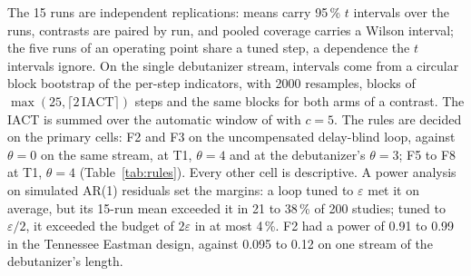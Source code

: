 The 15 runs are independent replications: means carry 95\,\% $t$ intervals over the runs,
contrasts are paired by run, and pooled coverage carries a Wilson interval; the five runs of an
operating point share a tuned step, a dependence the $t$ intervals ignore. On the single
debutanizer stream, intervals come from a circular block bootstrap \citep{politis1992} of the
per-step indicators, with 2000 resamples, blocks of $\max(25, \lceil 2\,\mathrm{IACT}\rceil)$
steps and the same blocks for both arms of a contrast. The IACT is summed over the automatic
window of \citet{sokal1997} with $c = 5$. The rules are decided on the primary cells: F2 and F3 on
the uncompensated delay-blind loop, against $\theta = 0$ on the same stream, at T1, $\theta = 4$
and at the debutanizer's $\theta = 3$; F5 to F8 at T1, $\theta = 4$ (Table~\ref{tab:rules}).
Every other cell is descriptive. A power analysis on simulated AR(1) residuals set the margins: a
loop tuned to $\varepsilon$ met it on average, but its 15-run mean exceeded it in 21 to 38\,\% of
200 studies; tuned to $\varepsilon/2$, it exceeded the budget of $2\varepsilon$ in at most
4\,\%. F2 had a power of 0.91 to 0.99 in the Tennessee Eastman design, against 0.095 to 0.12 on
one stream of the debutanizer's length.

